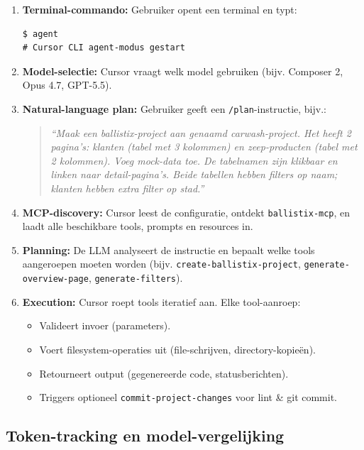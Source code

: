 \begin{enumerate}
  \item \textbf{Terminal-commando:} Gebruiker opent een terminal en typt:
    \begin{verbatim}
$ agent
# Cursor CLI agent-modus gestart
    \end{verbatim}
    
  \item \textbf{Model-selectie:} Cursor vraagt welk model gebruiken (bijv. Composer 2, Opus 4.7, GPT-5.5).
  
  \item \textbf{Natural-language plan:} Gebruiker geeft een \texttt{/plan}-instructie, bijv.:
    \begin{quote}
    \textit{``Maak een ballistix-project aan genaamd carwash-project. Het heeft 2 pagina's: klanten (tabel met 3 kolommen) en zeep-producten (tabel met 2 kolommen). Voeg mock-data toe. De tabelnamen zijn klikbaar en linken naar detail-pagina's. Beide tabellen hebben filters op naam; klanten hebben extra filter op stad.''}
    \end{quote}
    
  \item \textbf{MCP-discovery:} Cursor leest de configuratie, ontdekt \texttt{ballistix-mcp}, en laadt alle beschikbare tools, prompts en resources in.
  
  \item \textbf{Planning:} De LLM analyseert de instructie en bepaalt welke tools aangeroepen moeten worden (bijv. \texttt{create-ballistix-project}, \texttt{generate-overview-page}, \texttt{generate-filters}).
  
  \item \textbf{Execution:} Cursor roept tools iteratief aan. Elke tool-aanroep:
    \begin{itemize}
      \item Valideert invoer (parameters).
      \item Voert filesystem-operaties uit (file-schrijven, directory-kopieën).
      \item Retourneert output (gegenereerde code, statusberichten).
      \item Triggers optioneel \texttt{commit-project-changes} voor lint \& git commit.
    \end{itemize}
\end{enumerate}

\subsection{Token-tracking en model-vergelijking}

